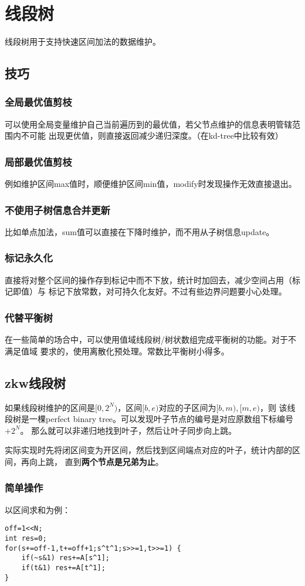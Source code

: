 \section{线段树}
线段树用于支持快速区间加法的数据维护。
\subsection{技巧}
\subsubsection{全局最优值剪枝}
可以使用全局变量维护自己当前遍历到的最优值，若父节点维护的信息表明管辖范围内不可能
出现更优值，则直接返回减少递归深度。（在kd-tree中比较有效）
\subsubsection{局部最优值剪枝}
例如维护区间max值时，顺便维护区间min值，modify时发现操作无效直接退出。
\subsubsection{不使用子树信息合并更新}
比如单点加法，sum值可以直接在下降时维护，而不用从子树信息update。
\subsubsection{标记永久化}
直接将对整个区间的操作存到标记中而不下放，统计时加回去，减少空间占用（标记即值）与
标记下放常数，对可持久化友好。不过有些边界问题要小心处理。
\subsubsection{代替平衡树}
在一些简单的场合中，可以使用值域线段树/树状数组完成平衡树的功能。对于不满足值域
要求的，使用离散化预处理。常数比平衡树小得多。
\subsection{zkw线段树}
如果线段树维护的区间是$[0,2^N)$，区间$[b,e)$对应的子区间为$[b,m),[m,e)$，则
该线段树是一棵perfect binary tree。可以发现叶子节点的编号是对应原数组下标编号$+2^N$。
那么就可以非递归地找到叶子，然后让叶子同步向上跳。

实际实现时先将闭区间变为开区间，然后找到区间端点对应的叶子，统计内部的区间，再向上跳，
直到{\bfseries 两个节点是兄弟为止}。

\subsubsection{简单操作}
以区间求和为例：
\begin{lstlisting}
off=1<<N;
int res=0;
for(s+=off-1,t+=off+1;s^t^1;s>>=1,t>>=1) {
    if(~s&1) res+=A[s^1];
    if(t&1) res+=A[t^1];
}
\end{lstlisting}

